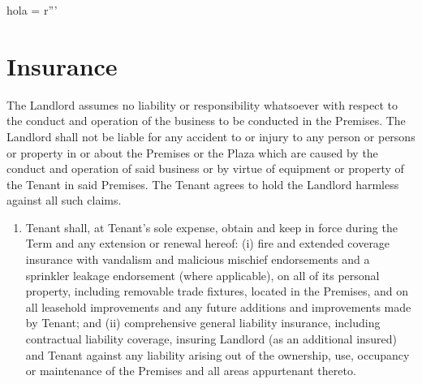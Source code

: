 hola = r'''\documentclass{article}
\begin{document}
\section{Insurance}
    The Landlord assumes no liability or responsibility whatsoever with respect to the conduct and operation of the business to be conducted in the Premises. The Landlord shall not be liable for any accident to or injury to any person or persons or property in or about the Premises or the Plaza which are caused by the conduct and operation of said business or by virtue of equipment or property of the Tenant in said Premises. The Tenant agrees to hold the Landlord harmless against all such claims.
    
    \begin{enumerate}

    \item	Tenant shall, at Tenant's sole expense, obtain and keep in force during the Term and any extension or renewal hereof: (i) fire and extended coverage insurance with vandalism and malicious mischief endorsements and a sprinkler leakage endorsement (where applicable), on all of its personal property, including removable trade fixtures, located in the Premises, and on all leasehold improvements and any future additions and improvements made by Tenant; and (ii) comprehensive general liability insurance, including contractual liability coverage, insuring Landlord (as an additional insured) and Tenant against any liability arising out of the ownership, use, occupancy or maintenance of the Premises and all areas appurtenant thereto.


\end{enumerate}
\end{document}
